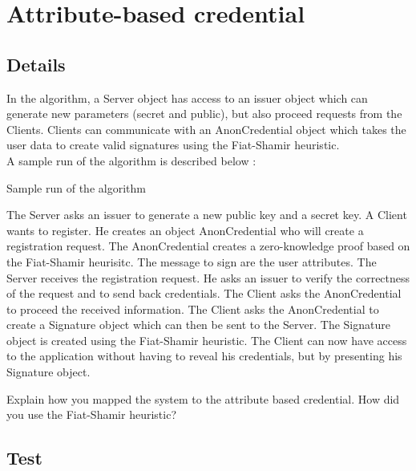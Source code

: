 \documentclass[10pt,conference,compsocconf]{IEEEtran}
\begin{document}

\section{Attribute-based credential}

\subsection{Details}

In the algorithm, a Server object has access to an issuer object which can generate new parameters (secret and public), but also proceed requests from the Clients. Clients can communicate with an AnonCredential object which takes the user data to create valid signatures using the Fiat-Shamir heuristic.\\
A sample run of the algorithm is described below : 

\begin{algorithm}
	\caption{Sample run of the algorithm}\label{Sample_run}
	\begin{algorithmic}[1]
		\State The Server asks an issuer to generate a new public key and a secret key.
		\State A Client wants to register. He creates an object AnonCredential who will create a registration request.
		\State The AnonCredential creates a zero-knowledge proof based on the Fiat-Shamir heurisitc. The message to sign are the user attributes.
		\State The Server receives the registration request. He asks an issuer to verify the correctness of the request and to send back credentials.
		\State The Client asks the AnonCredential to proceed the received information.
		\State The Client asks the AnonCredential to create a Signature object which can then be sent to the Server.
		\State The Signature object is created using the Fiat-Shamir heuristic.
		\State The Client can now have access to the application without having to reveal his credentials, but by presenting his Signature object.
	\end{algorithmic}
\end{algorithm}



Explain how you mapped the system to the attribute based credential. How did you
use the Fiat-Shamir heuristic?

\subsection{Test}
\end{document}
